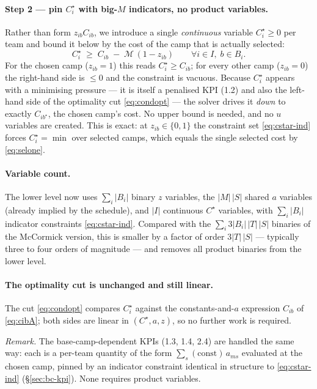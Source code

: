 \documentclass[12pt, letterpaper]{article}
\begin{document}
\paragraph{Step 2 --- pin $C_i^\star$ with big-$M$ indicators, no product
variables.} Rather than form $z_{ib}C_{ib}$, we introduce a single
\emph{continuous} variable $C_i^\star\ge0$ per team and bound it below by
the cost of the camp that is actually selected:
\begin{equation}
C_i^\star \;\ge\; C_{ib}\;-\;\mathcal{M}\,(1-z_{ib})
  \qquad\forall i\in I,\;b\in B_i.
\label{eq:cstar-ind}
\end{equation}
For the chosen camp ($z_{ib}=1$) this reads $C_i^\star\ge C_{ib}$; for
every other camp ($z_{ib}=0$) the right-hand side is $\le 0$ and the
constraint is vacuous. Because $C_i^\star$ appears with a minimising
pressure --- it is itself a penalised KPI (1.2) and also the left-hand
side of the optimality cut \eqref{eq:condopt} --- the solver drives it
\emph{down} to exactly $C_{ib^\star}$, the chosen camp's cost. No upper
bound is needed, and no $u$ variables are created. This is exact: at
$z_{ib}\in\{0,1\}$ the constraint set \eqref{eq:cstar-ind} forces
$C_i^\star=\min$ over selected camps, which equals the single selected
cost by \eqref{eq:selone}.

\paragraph{Variable count.} The lower level now uses $\sum_i|B_i|$ binary
$z$ variables, the $|M|\,|S|$ shared $a$ variables (already implied by the
schedule), and $|I|$ continuous $C^\star$ variables, with
$\sum_i|B_i|$ indicator constraints \eqref{eq:cstar-ind}. Compared with
the $\sum_i 3|B_i|\,|T|\,|S|$ binaries of the McCormick version, this is
smaller by a factor of order $3|T|\,|S|$ --- typically three to four
orders of magnitude --- and removes all product binaries from the lower
level.

\paragraph{The optimality cut is unchanged and still linear.} The cut
\eqref{eq:condopt} compares $C_i^\star$ against the constants-and-$a$
expression $C_{ib}$ of \eqref{eq:cibA}; both sides are linear in
$(C^\star,a,z)$, so no further work is required.

\medskip
\emph{Remark.} The base-camp-dependent KPIs (1.3, 1.4, 2.4) are handled
the same way: each is a per-team quantity of the form
$\sum_s(\text{const})\,a_{ms}$ evaluated at the chosen camp, pinned by an
indicator constraint identical in structure to \eqref{eq:cstar-ind}
(\S\ref{sec:bc-kpi}). None requires product variables.
\end{document}
